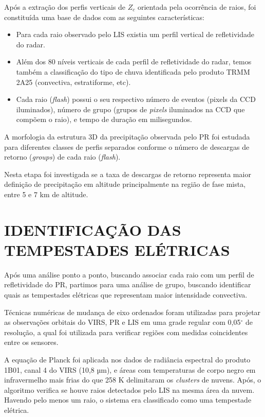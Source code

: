 Após a extração dos perfis verticais de $Z_c$ orientada pela ocorrência de raios, foi constituída uma base de dados com as seguintes características:

\begin{itemize}
\item Para cada raio observado pelo LIS existia um perfil vertical de refletividade do radar.
\item Além dos 80 níveis verticais de cada perfil de refletividade do radar, temos também a classificação do tipo de chuva identificada pelo produto TRMM 2A25 (convectiva, estratiforme, etc).
\item Cada raio (\textit{flash}) possui o seu respectivo número de eventos (pixels da CCD iluminados), número de grupo (grupos de \textit{pixels} iluminados na CCD que compõem o raio), e tempo de duração em milisegundos. 
\end{itemize}

A morfologia da estrutura 3D da precipitação observada pelo PR foi estudada para diferentes classes de perfis separados conforme o número de descargas de retorno (\textit{groups}) de cada raio (\textit{flash}). 

Nesta etapa foi investigada se a taxa de descargas de retorno representa maior definição de precipitação em altitude principalmente na região de fase mista, entre 5 e 7 km de altitude. 

\section{IDENTIFICAÇÃO DAS TEMPESTADES ELÉTRICAS}

Após uma análise ponto a ponto, buscando associar cada raio com um perfil de refletividade do PR, partimos para uma análise de grupo, buscando identificar quais as tempestades elétricas que representam maior intensidade convectiva.

Técnicas numéricas de mudança de eixo ordenados foram utilizadas para projetar as
observações orbitais do VIRS, PR e LIS em uma grade regular com 0,05$^{\circ}$ de resolução, a qual foi utilizada para verificar regiões com medidas coincidentes entre os sensores.

A equação de Planck foi aplicada nos dados de radiância espectral do produto 1B01, canal 4 do VIRS (10,8 µm), e áreas com temperaturas de corpo negro em infravermelho mais frias do que 258 K delimitaram os \textit{clusters} de nuvens. Após, o algoritmo verifica se houve raios detectados pelo LIS na mesma área da nuvem. Havendo pelo menos um raio, o sistema era classificado como uma tempestade elétrica. 

